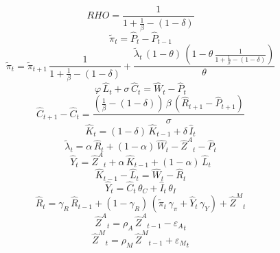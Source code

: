 \begin{dmath*}
RHO = \frac{1}{1+\frac{1}{{{\beta}}}-\left(1-{{\delta}}\right)}
\end{dmath*}
\begin{dmath}
{{\tilde{\pi}}}_{t}={{\hat{P}}}_{t}-{{\hat{P}}}_{t-1}
\end{dmath}
\begin{dmath}
{{\tilde{\pi}}}_{t}={{\tilde{\pi}}}_{t+1}\, \frac{1}{1+\frac{1}{{{\beta}}}-\left(1-{{\delta}}\right)}+\frac{{{\tilde{\lambda}}}_{t}\, \left(1-{{\theta}}\right)\, \left(1-{{\theta}}\, \frac{1}{1+\frac{1}{{{\beta}}}-\left(1-{{\delta}}\right)}\right)}{{{\theta}}}
\end{dmath}
\begin{dmath}
{{\varphi}}\, {{\hat{L}}}_{t}+{{\sigma}}\, {{\hat{C}}}_{t}={{\hat{W}}}_{t}-{{\hat{P}}}_{t}
\end{dmath}
\begin{dmath}
{{\hat{C}}}_{t+1}-{{\hat{C}}}_{t}=\frac{\left(\frac{1}{{{\beta}}}-\left(1-{{\delta}}\right)\right)\, {{\beta}}\, \left({{\hat{R}}}_{t+1}-{{\hat{P}}}_{t+1}\right)}{{{\sigma}}}
\end{dmath}
\begin{dmath}
{{\hat{K}}}_{t}=\left(1-{{\delta}}\right)\, {{\hat{K}}}_{t-1}+{{\delta}}\, {{\hat{I}}}_{t}
\end{dmath}
\begin{dmath}
{{\tilde{\lambda}}}_{t}={{\alpha}}\, {{\hat{R}}}_{t}+\left(1-{{\alpha}}\right)\, {{\hat{W}}}_{t}-{{\hat{Z}^A}}_{t}-{{\hat{P}}}_{t}
\end{dmath}
\begin{dmath}
{{\hat{Y}}}_{t}={{\hat{Z}^A}}_{t}+{{\alpha}}\, {{\hat{K}}}_{t-1}+\left(1-{{\alpha}}\right)\, {{\hat{L}}}_{t}
\end{dmath}
\begin{dmath}
{{\hat{K}}}_{t-1}-{{\hat{L}}}_{t}={{\hat{W}}}_{t}-{{\hat{R}}}_{t}
\end{dmath}
\begin{dmath}
{{\hat{Y}}}_{t}={{\hat{C}}}_{t}\, {{\theta_C}}+{{\hat{I}}}_{t}\, {{\theta_I}}
\end{dmath}
\begin{dmath}
{{\hat{R}}}_{t}={{\gamma_R}}\, {{\hat{R}}}_{t-1}+\left(1-{{\gamma_R}}\right)\, \left({{\tilde{\pi}}}_{t}\, {{\gamma_\pi}}+{{\hat{Y}}}_{t}\, {{\gamma_Y}}\right)+{{\hat{Z}^M}}_{t}
\end{dmath}
\begin{dmath}
{{\hat{Z}^A}}_{t}={{\rho_A}}\, {{\hat{Z}^A}}_{t-1}-{{\varepsilon_A}}_{t}
\end{dmath}
\begin{dmath}
{{\hat{Z}^M}}_{t}={{\rho_M}}\, {{\hat{Z}^M}}_{t-1}+{{\varepsilon_M}}_{t}
\end{dmath}
